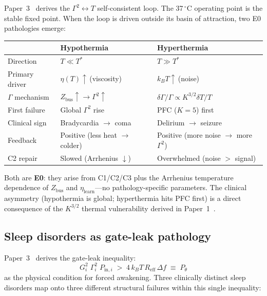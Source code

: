 \documentclass[aps,pre,twocolumn,superscriptaddress,floatfix]{revtex4-2}
\begin{document}
Paper~3~\cite{Paper3} derives the
$\Gamma^2\!\leftrightarrow\!T$
self-consistent loop.
The 37$\,^\circ$C operating point is the stable
fixed point.
When the loop is driven outside its basin of
attraction, two E0 pathologies emerge:

\begin{center}
\begin{tabular}{@{}lll@{}}
\toprule
& \textbf{Hypothermia} &
  \textbf{Hyperthermia} \\
\midrule
Direction & $T \ll T^*$ & $T \gg T^*$ \\
Primary driver &
  $\eta(T)\!\uparrow$\,(viscosity) &
  $k_BT\!\uparrow$\,(noise) \\
$\Gamma$ mechanism &
  $Z_{\mathrm{bus}}\!\uparrow \to
  \Gamma^2\!\uparrow$ &
  $\delta\Gamma/\Gamma \propto
  K^{3/2}\delta T/T$ \\
First failure & Global $\Gamma^2$ rise &
  PFC ($K{=}5$) first \\
Clinical sign &
  Bradycardia $\to$ coma &
  Delirium $\to$ seizure \\
Feedback & Positive
  (less heat $\to$ colder) &
  Positive
  (more noise $\to$ more $\Gamma^2$) \\
C2 repair &
  Slowed (Arrhenius $\downarrow$) &
  Overwhelmed (noise $>$ signal) \\
\bottomrule
\end{tabular}
\end{center}

\noindent
Both are \textbf{E0}: they arise from C1/C2/C3
plus the Arrhenius temperature dependence of
$Z_{\mathrm{bus}}$ and $\eta_{\mathrm{learn}}$---no
pathology-specific parameters.
The clinical asymmetry (hypothermia is global;
hyperthermia hits PFC first) is a direct
consequence of the $K^{3/2}$ thermal vulnerability
derived in Paper~1~\cite{Paper1}.


\subsection{Sleep disorders as gate-leak pathology}
\label{sec:sleep-disorders}

Paper~3~\cite{Paper3} derives the gate-leak
inequality:
\begin{equation}
  G_i^2\;\Gamma_i^2\;P_{\mathrm{in},i}
  \;>\;
  4\,k_B T\,R_{\mathrm{eff}}\,\Delta f
  \;\equiv\; P_\theta
  \tag{P3, Eq.\,10}
\end{equation}
as the physical condition for forced awakening.
Three clinically distinct sleep disorders map onto
three different structural failures within this
single inequality:
\end{document}

